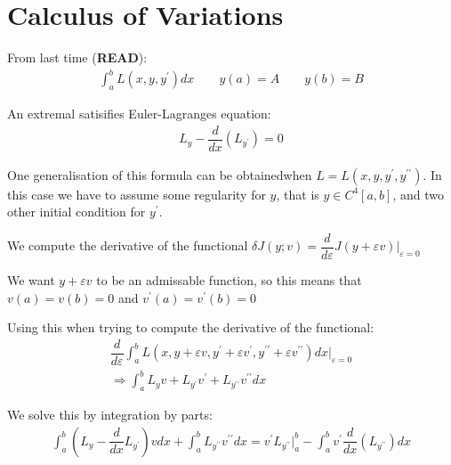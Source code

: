\section{Calculus of Variations}
\noindent From last time (\textbf{READ}):
\begin{equation*}
  \begin{gathered}
    \int_{a}^{b}L(x,y,y^{\prime})dx\qquad y(a) = A\qquad y(b) = B
  \end{gathered}
\end{equation*}
\par\bigskip
\noindent An extremal satisifies Euler-Lagranges equation:
\begin{equation*}
  \begin{gathered}
    L_y -\dfrac{d}{dx}(L_{y^{\prime}}) = 0
  \end{gathered}
\end{equation*}
\par\bigskip
\noindent One generalisation of this formula can be obtainedwhen $L = L(x,y,y^{\prime}, y^{\prime\prime})$. In this case we have to assume some regularity for $y$, that is $y\in C^4[a,b]$, and two other initial condition for $y^{\prime}$. 
\par\bigskip
\noindent We compute the derivative of the functional  $\delta J(y; v) = \dfrac{d}{d\varepsilon}J(y+\varepsilon v)|_{\varepsilon=0}$\par
\noindent We want $y+\varepsilon v$ to be an admissable function, so this means that $ v(a) =  v(b)=0$ and $ v^{\prime}(a)= v^{\prime}(b)=0$
\par\bigskip
\noindent Using this when trying to compute the derivative of the functional:
\begin{equation*}
  \begin{gathered}
    \dfrac{d}{d\varepsilon}\int_{a}^{b}L(x,y+\varepsilon v,y^{\prime}+\varepsilon v^{\prime},y^{\prime\prime}+\varepsilon v^{\prime\prime})dx|_{\varepsilon=0}\\
    \Rightarrow \int_{a}^{b}L_y v+L_{y^{\prime}} v^{\prime}+L_{y^{\prime\prime}} v^{\prime\prime}dx
  \end{gathered}
\end{equation*}\par
\noindent We solve this by integration by parts:
\begin{equation*}
  \begin{gathered}
    \int_{a}^{b}(L_y-\dfrac{d}{dx}L_{y^{\prime}}) v dx +\int_{a}^{b}L_{y^{\prime\prime}} v^{\prime\prime}dx  =  v^{\prime}L_{y^{\prime\prime}}|_a^b-\int_{a}^{b} v^{\prime}\dfrac{d}{dx}(L_{y^{\prime\prime}})dx
  \end{gathered}
\end{equation*}\par
